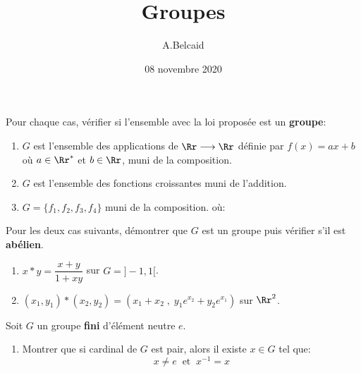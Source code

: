 \documentclass[10pt, a4paper, twocolumn]{homework}
\title{Groupes}
\date{08 novembre 2020}
\author{A.Belcaid}
\begin{document}
\maketitle


Pour chaque cas, vérifier si l'ensemble avec la loi proposée est un
\textbf{groupe}:

\begin{enumerate}
  \item $G$ est l'ensemble des applications de $\Rr\longrightarrow\Rr$ définie
    par $f(x) = ax + b$ où $a\in \Rr^{*}$ et $b\in \Rr$, muni de la composition.

  \item $G$ est l'ensemble des fonctions croissantes muni de l'addition.
  \item $G = \{f_1, f_2, f_3, f_4\}$ muni de la composition.
    où:\\
\end{enumerate}
Pour les deux cas suivants, démontrer que $G$ est un groupe puis vérifier s'il
est \textbf{abélien}.

\begin{enumerate}
  \item $x * y = \dfrac{x+y}{1 + xy}$ sur $G= ]-1,1[$.\\[2pt]
  \item $(x_1,y_1)*(x_2,y_2) = (x_1+x_2\;,\; y_1e^{x_2} + y_2e^{x_1})$ sur
    $\Rr^2$.\\[8pt] 
\end{enumerate}

Soit $G$ un groupe \textbf{fini} d'élément neutre $e$.\\
\begin{enumerate}
  \item 
Montrer que si cardinal de $G$ est pair, alors il existe $x\in G$ tel que:
$$x\neq
e\;\;\text{et}\;\; x^{-1} = x$$
\end{enumerate}
\end{document}
